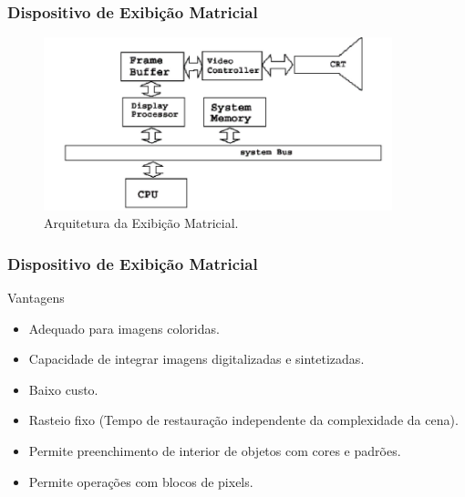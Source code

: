 \documentclass{beamer}
\begin{document}

\begin{frame}
\frametitle{Dispositivo de Exibição Matricial}

	\begin{figure}[!h]
		\begin{center}
			\includegraphics[width=0.9\textwidth]{Figures/arqMatrix}
			\caption{Arquitetura da Exibição Matricial.}
		\end{center}
	\end{figure}
	
\end{frame}


\begin{frame}
\frametitle{Dispositivo de Exibição Matricial}

	\begin{block}{Vantagens}
		\begin{itemize}
			\item Adequado para imagens coloridas.
			\item Capacidade de integrar imagens digitalizadas e sintetizadas.
			\item Baixo custo.
			\item Rasteio fixo (Tempo de restauração independente da complexidade da cena).
			\item Permite preenchimento de interior de objetos com cores e padrões.
			\item Permite operações com blocos de pixels.
		\end{itemize}
	
	\end{block}
	
\end{frame}

\end{document}

